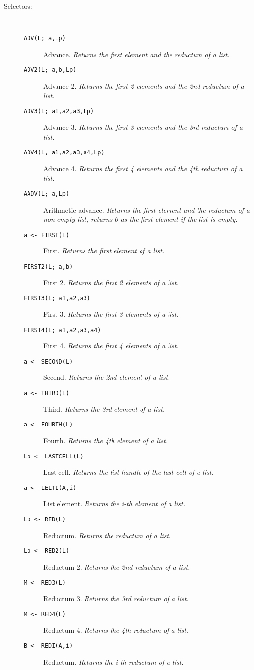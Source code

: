 \begin{description}
\item[Selectors:] \ \
  \begin{description}
  \item[{\tt  ADV(L; a,Lp) 
}]  Advance. {\em Returns the first element and the reductum of a
  list.}
  \item[{\tt  ADV2(L; a,b,Lp) 
}]  Advance 2. {\em Returns the first 2 elements and the 2nd
  reductum of a list.}
  \item[{\tt  ADV3(L; a1,a2,a3,Lp) 
}]  Advance 3. {\em Returns the first 3 elements and the 3rd
  reductum of a list.}
  \item[{\tt  ADV4(L; a1,a2,a3,a4,Lp) 
}]  Advance 4. {\em Returns the first 4 elements and the 4th
  reductum of a list.}
  \item[{\tt  AADV(L; a,Lp) 
}]  Arithmetic advance. {\em Returns the first element and the
    reductum of a non-empty list, returns 0 as the first element if the
    list is empty.}
  \item[{\tt  a <- FIRST(L) 
}]  First. {\em Returns the first element of a list.}
  \item[{\tt  FIRST2(L; a,b) 
}] First 2. {\em Returns the first 2 elements of a list.}
  \item[{\tt  FIRST3(L; a1,a2,a3) 
}]  First 3. {\em Returns the first 3 elements of a list.}
  \item[{\tt  FIRST4(L; a1,a2,a3,a4) 
}]  First 4. {\em Returns the first 4 elements of a list.}
  \item[{\tt  a <- SECOND(L) 
}]  Second. {\em Returns the 2nd element of a list.}
  \item[{\tt a <- THIRD(L) 
}]  Third. {\em Returns the 3rd element of a list.}
  \item[{\tt a <- FOURTH(L) 
}]  Fourth. {\em Returns the 4th element of a list.}
  \item[{\tt Lp <- LASTCELL(L) 
}]  Last cell. {\em Returns the list handle of the last cell
     of a list.}
  \item[{\tt a <- LELTI(A,i) 
}]  List element. {\em Returns the i-th element of a list.}
  \item[{\tt  Lp <- RED(L) 
}]  Reductum. {\em Returns the reductum of a list.}
  \item[{\tt  Lp <- RED2(L) 
}]  Reductum 2. {\em Returns the 2nd reductum of a list.}
  \item[{\tt M <- RED3(L) 
}]  Reductum 3. {\em Returns the 3rd reductum of a list.}
  \item[{\tt M <- RED4(L) 
}]  Reductum 4. {\em Returns the 4th reductum of a list.}
  \item[{\tt B <- REDI(A,i) 
}] Reductum. {\em Returns the i-th reductum of a list.}
  \end{description}


\end{description}

